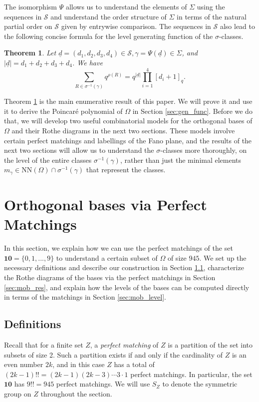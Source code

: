 \documentclass[11pt]{amsart}
\theoremstyle{plain}
\newtheorem{theorem}{Theorem}[section]
\theoremstyle{definition}
\theoremstyle{remark}
\numberwithin{equation}{section}
\newcommand{\seqd}{\underline{d}}
\newcommand{\cals}{\mathcal{S}}
\newcommand{\ten}{\mathbf{10}}
\newcommand{\ob}{\Omega}
\newcommand{\nn}{\mathrm{NN}}
\newcommand{\inverse}{^{-1}}
\newcommand{\abs}[1]{\lvert #1 \rvert}
\begin{document}
The isomorphism $\Psi$ allows us to understand the elements of $\Sigma$ using
the sequences in $\cals$ and understand the order structure of $\Sigma$ in terms
of the natural partial order on $\cals$ given by entrywise comparison. The
sequences in $\cals$ also lead to the following concise formula for the level
generating function of the $\sigma$-classes.

\begin{theorem}
\label{thm:gen_func}
Let $\seqd=(d_1,d_2,d_3,d_4)\in \cals, \gamma=\Psi(\seqd)\in \Sigma$, and
$\abs{\seqd}=d_1+d_2+d_3+d_4$. We have
\[
  \sum_{R\in \sigma\inverse(\gamma)}q^{\rho(R)}=q^{\abs{\seqd}}\prod_{i=1}^4 
  [d_i+1]_q.
\]
\end{theorem}

Theorem \ref{thm:gen_func} is the main enumerative result of this paper. We will
prove it and use it to derive the Poincar\'e polynomial of $\ob$ in Section
\ref{sec:gen_func}. Before we do that, we will develop two useful combinatorial
models for the orthogonal bases of $\ob$ and their Rothe diagrams in the next two
sections. These models involve certain perfect matchings and labellings of the
Fano plane, and the results of the next two sections will allow us to understand
the $\sigma$-classes more thoroughly, on the level of the entire classes
$\sigma\inverse(\gamma)$, rather than just the minimal elements $m_\gamma\in
\nn(\ob)\cap \sigma\inverse(\gamma)$ that represent the classes.


\section{Orthogonal bases via Perfect Matchings}
\label{sec:mob}

In this section, we explain how we can use the perfect matchings of the set
$\ten = \{0, 1, ..., 9\}$ to understand a certain subset of $\ob$ of
size $945$. We set up the necessary definitions and describe our construction in
Section \ref{sec:mob_def}, characterize the Rothe diagrams of the bases via the
perfect matchings in Section \ref{sec:mob_res}, and explain how the levels of
the bases can be computed directly in terms of the matchings in Section
\ref{sec:mob_level}.

\subsection{Definitions}
\label{sec:mob_def}
Recall that for a finite set $Z$, a \emph{perfect matching} of $Z$ is a partition of
the set into subsets of size 2. Such a partition exists if and only
if the cardinality of $Z$ is an even number $2k$, and in this case 
$Z$ has a total of $(2k-1)!!=(2k-1)(2k-3)\cdots 3\cdot 1$
perfect matchings. In particular, the set $\ten$ has $9!!=945$ perfect matchings. 
We will use $S_Z$ to denote the symmetric group on
$Z$ throughout the section.
\end{document}
